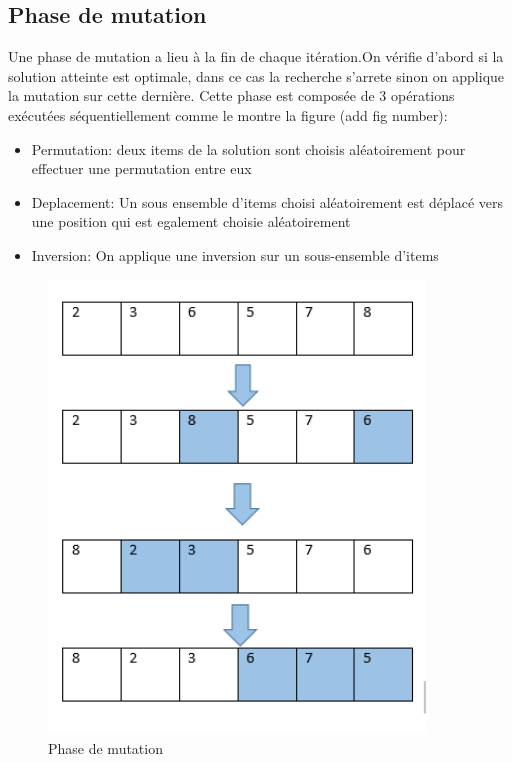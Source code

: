 \documentclass[12pt]{article}
\begin{document}
\subsection{Phase de mutation}
Une phase de mutation a lieu à la fin de chaque itération.On vérifie d'abord si la solution atteinte est optimale, dans ce cas la recherche s'arrete sinon on applique la mutation sur cette dernière.
Cette phase est composée de 3 opérations exécutées séquentiellement comme le montre la figure (add fig number): 
\begin{itemize}
    \item Permutation: deux items de la solution sont choisis aléatoirement pour effectuer une permutation entre eux
    \item Deplacement: Un sous ensemble d'items choisi aléatoirement est déplacé vers une position qui est egalement choisie aléatoirement
    \item Inversion: On applique une inversion sur un sous-ensemble d'items
\end{itemize}
\begin{figure}[h!]
   \centering
    \includegraphics[width=10cm]{../figures/Mutation.PNG}
    \caption{Phase de mutation}
\end{figure}
\end{document}
